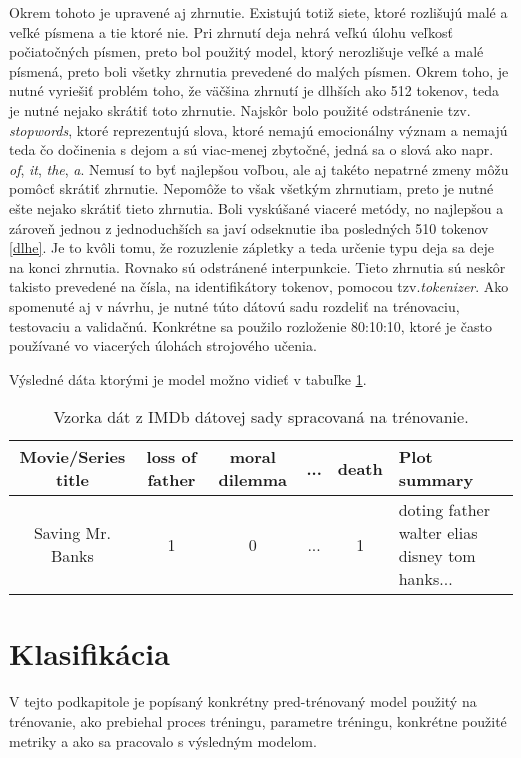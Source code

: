 Okrem tohoto je upravené aj zhrnutie. Existujú totiž siete, ktoré rozlišujú malé a veľké písmena a tie ktoré nie. Pri zhrnutí deja nehrá veľkú úlohu veľkosť počiatočných písmen, preto bol použitý model, ktorý nerozlišuje veľké a malé písmená, preto boli všetky zhrnutia prevedené do malých písmen. Okrem toho, je nutné vyriešiť problém toho, že väčšina zhrnutí je dlhších ako 512 tokenov, teda je nutné nejako skrátiť toto zhrnutie. Najskôr bolo použité odstránenie tzv. \textit{stopwords}, ktoré reprezentujú slova, ktoré nemajú emocionálny význam a  nemajú teda čo dočinenia s dejom a sú viac-menej zbytočné, jedná sa o slová ako napr. \textit{of}, \textit{it}, \textit{the}, \textit{a}. Nemusí to byť najlepšou voľbou, ale aj takéto nepatrné zmeny môžu pomôcť skrátiť zhrnutie. Nepomôže to však všetkým zhrnutiam, preto je nutné ešte nejako skrátiť tieto zhrnutia. Boli vyskúšané viaceré metódy, no najlepšou a zároveň jednou z jednoduchších sa javí odseknutie iba posledných 510 tokenov \ref{dlhe}. Je to kvôli tomu, že rozuzlenie zápletky a teda určenie typu deja sa deje na konci zhrnutia. Rovnako sú odstránené interpunkcie. Tieto zhrnutia sú neskôr takisto prevedené na čísla, na identifikátory tokenov, pomocou tzv.\textit{tokenizer}. Ako spomenuté aj v návrhu, je nutné túto dátovú sadu rozdeliť na trénovaciu, testovaciu a validačnú. Konkrétne sa použilo rozloženie 80:10:10, ktoré je často používané vo viacerých úlohách strojového učenia.

Výsledné dáta ktorými je model  možno vidieť v tabuľke \ref{spracovane}.

\begin{table}[hbt]
\centering
\caption{Vzorka dát z IMDb dátovej sady spracovaná na trénovanie.}
\label{spracovane}
\begin{tabular}{|c|c|c|c|c|
>{\centering\arraybackslash}m{7em}|}
\hline
Movie/Series title & loss of father & moral dilemma & ... & death  & Plot summary \\
\hline
Saving Mr. Banks & 1 & 0  & ... & 1 &  doting father walter elias disney tom hanks...\\ 
\hline

\end{tabular}
\end{table}


\section{Klasifikácia}

V tejto podkapitole je popísaný konkrétny pred-trénovaný model použitý na trénovanie, ako prebiehal proces tréningu, parametre tréningu, konkrétne použité metriky a ako sa pracovalo s výsledným modelom. 

